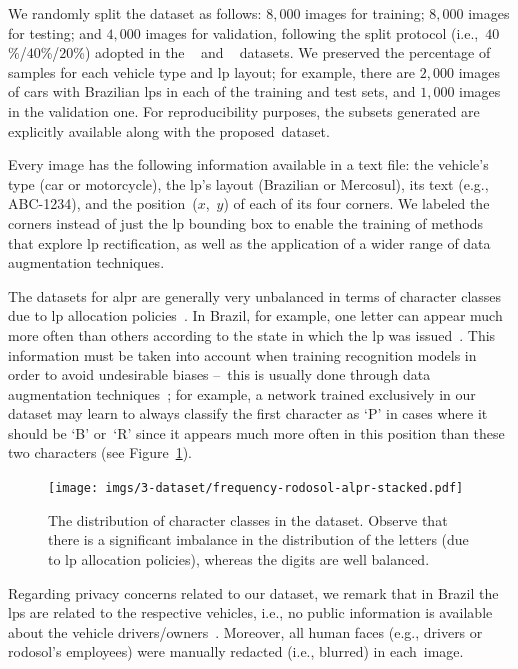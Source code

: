 We randomly split the \dataset dataset as follows: $8{,}000$ images for training; $8{,}000$ images for testing; and $4{,}000$ images for validation, following the split protocol (i.e.,~$40$\%/$40$\%/$20$\%) adopted in the \ssigsegplate~\citep{goncalves2016benchmark} and \ufpralpr~\citep{laroca2018robust} datasets.
We preserved the percentage of samples for each vehicle type and \gls*{lp} layout; for example, there are $2{,}000$ images of cars with Brazilian \glspl*{lp} in each of the training and test sets, and $1{,}000$ images in the validation one.
For reproducibility purposes, the subsets generated are explicitly available along with the proposed~dataset.

Every image has the following information available in a text file: the vehicle's type (car or motorcycle), the \gls*{lp}'s layout (Brazilian or Mercosul), its text (e.g., ABC-1234), and the position~($x$,~$y$) of each of its four corners.
We labeled the corners instead of just the \gls*{lp} bounding box to enable the training of methods that explore \gls*{lp} rectification, as well as the application of a wider range of data augmentation techniques.

The datasets for \gls*{alpr} are generally very unbalanced in terms of character classes due to \gls*{lp} allocation policies~\citep{zhang2021robust_attentional}.
In Brazil, for example, one letter can appear much more often than others according to the state in which the \gls*{lp} was issued~\citep{goncalves2018realtime,laroca2018robust}.
This information must be taken into account when training recognition models in order to avoid undesirable biases --~this is usually done through data augmentation techniques~\citep{zhang2021robust_attentional,hasnat2021robust}; for example, a network trained exclusively in our dataset may learn to always classify the first character as `P' in cases where it should be `B' or~`R' since it appears much more often in this position than these two characters (see Figure~\ref{fig:frequency}).

\begin{figure}[!htb]
    \centering
    \texttt{[image: imgs/3-dataset/frequency-rodosol-alpr-stacked.pdf]} \,
    
    \vspace{-1.25mm}
    
    \caption{The distribution of character classes in the \dataset dataset. Observe that there is a significant imbalance in the distribution of the letters (due to \gls*{lp} allocation policies), whereas the digits are well balanced.}
    \label{fig:frequency}
\end{figure}

Regarding privacy concerns related to our dataset, we remark that in Brazil the \glspl*{lp} are related to the respective vehicles, i.e., no public information is available about the vehicle drivers/owners~\citep{placa_veiculo_planalto,oliveira2021vehicle}.
Moreover, all human faces (e.g., drivers or \gls*{rodosol}'s employees) were manually redacted (i.e., blurred) in each~image.